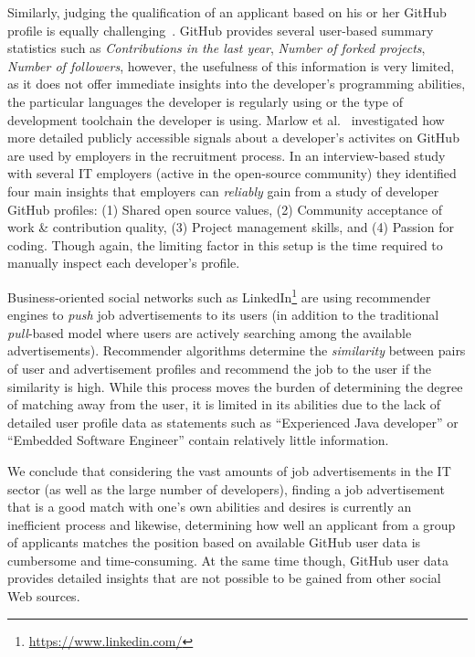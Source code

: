 \documentclass[conference]{IEEEtran}
\begin{document}
Similarly, judging the qualification of an applicant based on his or her GitHub
profile is equally challenging~\cite{Singer:2013:MAS:2441776.2441791}. GitHub
provides several user-based summary statistics such as \emph{Contributions in
the last year}, \emph{Number of forked projects}, \emph{Number of followers},
however, the usefulness of this information is very limited, as it does not
offer immediate insights into the developer's programming abilities, the
particular languages the developer is regularly using or the type of development
toolchain the developer is using.  Marlow et
al.~\cite{Marlow:2013:ATS:2441776.2441794} investigated how more detailed
publicly accessible signals about a developer's activites on GitHub are used by
employers in the recruitment process. In an interview-based study with several
IT employers (active in the open-source community) they identified four main
insights that employers can \emph{reliably} gain from a study of developer
GitHub profiles: (1) Shared open source values, (2) Community acceptance of work
\& contribution quality, (3) Project management skills, and (4) Passion for
coding. Though again, the limiting factor in this setup is the time required to
manually inspect each developer's profile.

Business-oriented social networks such as
LinkedIn\footnote{\url{https://www.linkedin.com/}} are using recommender engines
to \emph{push} job advertisements to its users (in addition to the traditional
\emph{pull}-based model where users are actively searching among the available
advertisements). Recommender algorithms determine the \emph{similarity} between
pairs of user and advertisement profiles and recommend the job to the user if
the similarity is high. While this process moves the burden of determining the
degree of matching away from the user, it is limited in its abilities due to the
lack of detailed user profile data as statements such as ``Experienced Java
developer'' or ``Embedded Software Engineer'' contain relatively little
information.

We conclude that considering the vast amounts of job advertisements in the IT
sector (as well as the large number of developers), finding a job advertisement
that is a good match with one's own abilities and desires is currently an
inefficient process and likewise, determining how well an applicant from a group
of applicants matches the position based on available GitHub user data is
cumbersome and time-consuming. At the same time though, GitHub user data
provides detailed insights that are not possible to be gained from other social
Web sources.
\end{document}
